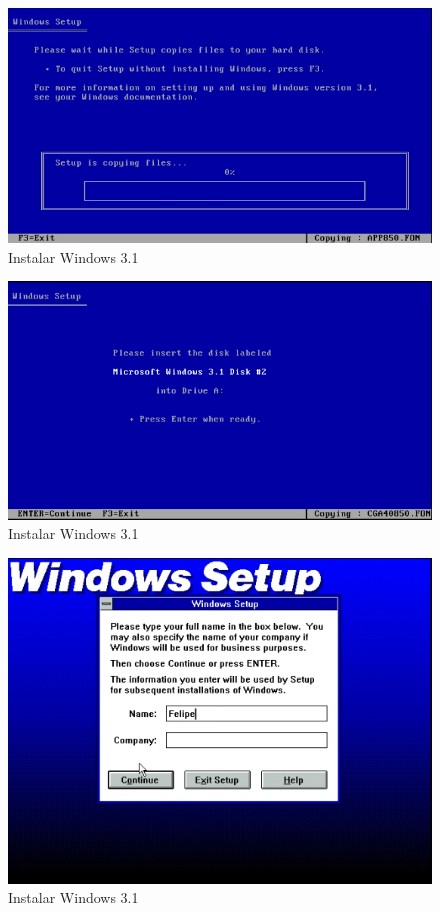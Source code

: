 \documentclass{report}
\begin{document}
\begin{figure}
\centering
\includegraphics[width=\textwidth]{Screenshot_27.png}
\caption{Instalar Windows 3.1}
\label{fig:27}
\end{figure}

\begin{figure}
\centering
\includegraphics[width=\textwidth]{Screenshot_28.png}
\caption{Instalar Windows 3.1}
\label{fig:28}
\end{figure}

\begin{figure}
\centering
\includegraphics[width=\textwidth]{Screenshot_29.png}
\caption{Instalar Windows 3.1}
\label{fig:29}
\end{figure}
\end{document}
